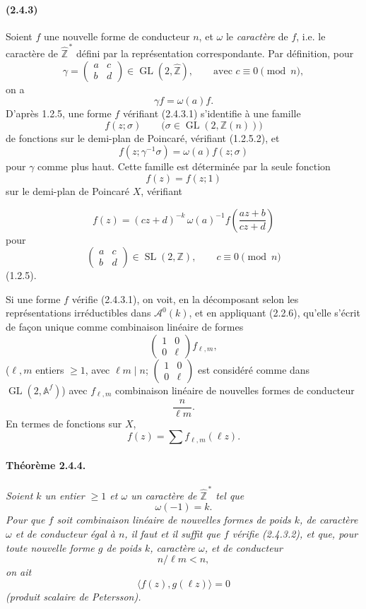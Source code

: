 \documentclass[10pt,a4paper]{article}
\providecommand{\GL}{\operatorname{GL}}
\providecommand{\SL}{\operatorname{SL}}
\providecommand{\Z}{\mathbb Z}
\providecommand{\Af}{\mathbb A^f}
\begin{document}
\paragraph{(2.4.3)} Soient \(f\) une nouvelle forme de conducteur \(n\), et \(\omega\) le \emph{caractère} de \(f\), i.e. le caractère de \(\widehat{\Z}^{\,*}\) défini par la représentation correspondante. Par définition, pour
\[
\gamma=\begin{pmatrix}a&c\\ b&d\end{pmatrix}\in\GL(2,\widehat{\Z}),
\qquad\text{avec }c\equiv0\pmod n,
\]
on a
\[
\tag{2.4.3.1}
\gamma f=\omega(a)f.
\]
D'après 1.2.5, une forme \(f\) vérifiant (2.4.3.1) s'identifie à une famille
\[
f(z;\sigma)\qquad \bigl(\sigma\in\GL(2,\Z(n))\bigr)
\]
de fonctions sur le demi-plan de Poincaré, vérifiant (1.2.5.2), et
\[
f(z;\gamma^{-1}\sigma)=\omega(a)f(z;\sigma)
\]
pour \(\gamma\) comme plus haut. Cette famille est déterminée par la seule fonction
\[
f(z)=f(z;1)
\]
sur le demi-plan de Poincaré \(X\), vérifiant

\clearpage
{}
\hypertarget{authority-32}{}
\[
\tag{2.4.3.2}
f(z)=(cz+d)^{-k}\,\omega(a)^{-1}
f\!\left(\frac{az+b}{cz+d}\right)
\]
pour
\[
\begin{pmatrix}a&c\\ b&d\end{pmatrix}\in\SL(2,\Z),
\qquad c\equiv0\pmod n
\]
(1.2.5).

Si une forme \(f\) vérifie (2.4.3.1), on voit, en la décomposant selon les représentations irréductibles dans \(\mathcal A^0(k)\), et en appliquant (2.2.6), qu'elle s'écrit de façon unique comme combinaison linéaire de formes
\[
\begin{pmatrix}1&0\\0&\ell\end{pmatrix}f_{\ell,m},
\]
(\(\ell,m\) entiers \(\ge1\), avec \(\ell m\mid n\); \(\begin{pmatrix}1&0\\0&\ell\end{pmatrix}\) est considéré comme dans \(\GL(2,\Af)\)) avec \(f_{\ell,m}\) combinaison linéaire de nouvelles formes de conducteur
\[
\frac{n}{\ell m}.
\]
En termes de fonctions sur \(X\),
\[
\tag{2.4.3.3}
f(z)=\sum f_{\ell,m}(\ell z).
\]

\paragraph{Théorème 2.4.4.}{\itshape  Soient \(k\) un entier \(\ge1\) et \(\omega\) un caractère de \(\widehat{\Z}^{\,*}\) tel que
\[
\omega(-1)=k.
\]
Pour que \(f\) soit combinaison linéaire de nouvelles formes de poids \(k\), de caractère \(\omega\) et de conducteur égal à \(n\), il faut et il suffit que \(f\) vérifie (2.4.3.2), et que, pour toute nouvelle forme \(g\) de poids \(k\), caractère \(\omega\), et de conducteur
\[
n/\ell m<n,
\]
on ait
\[
\langle f(z),g(\ell z)\rangle=0
\]
(produit scalaire de Petersson).\par}
\end{document}
